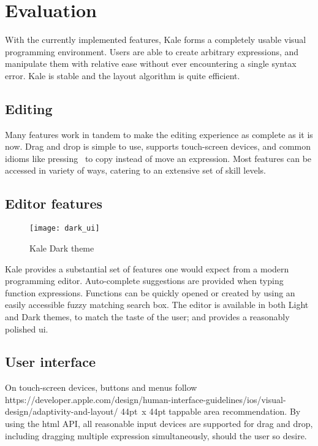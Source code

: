 \chapter{Evaluation}

With the currently implemented features, Kale forms a completely
usable visual programming environment. Users are able to create
arbitrary expressions, and manipulate them with relative ease without
ever encountering a single syntax error. Kale is stable and the layout
algorithm is quite efficient.

\section{Editing}
Many features work in tandem to make the editing experience as complete as it
is now. Drag and drop is simple to use, supports touch-screen devices, and
common idioms like pressing~\keys{\ctrl} to copy instead of move an expression.
Most features can be accessed in variety of ways, catering to an extensive
set of skill levels. %


\section{Editor features}
\begin{wrapfigure}[11]{r}{8cm}
\texttt{[image: dark\_ui]}	
\caption{Kale Dark theme}
\end{wrapfigure}

Kale provides a substantial set of features one would expect from a modern
programming editor. Auto-complete suggestions are provided when typing
function expressions. Functions can be quickly opened or created by using an
easily accessible fuzzy matching search box. The editor is available in both
Light and Dark themes, to match the taste of the user; and provides a
reasonably polished \ac{ui}.

\section{User interface}
On touch-screen devices, buttons and menus follow
{https://developer.apple.com/design/human-interface-guidelines/ios/visual-design/adaptivity-and-layout/}
44pt~x 44pt tappable area recommendation. By using the \ac{html}
 API,
all reasonable input devices are supported for drag and drop, including dragging
multiple expression simultaneously, should the user so desire.

